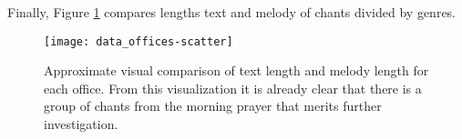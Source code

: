 Finally, Figure \ref{fig:offices-scatter} compares lengths text and melody of chants divided by genres.

\begin{figure}[h!]
\centering
\texttt{[image: data\_offices-scatter]}
\caption{Approximate visual comparison of text length and melody length for each office. From this visualization it is already clear that there is a group
of chants from the morning prayer that merits further investigation.}
\label{fig:offices-scatter}
\end{figure}
